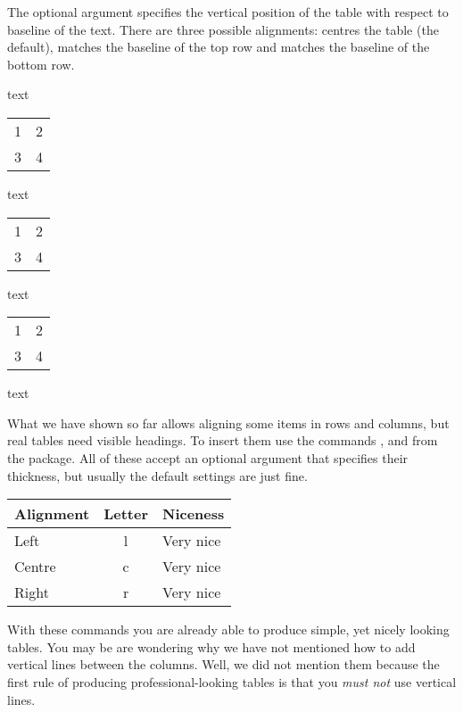 The optional  argument specifies the vertical position of the table
with respect to baseline of the text. There are three possible alignments:
 centres the table (the default),  matches the baseline of
the top row and  matches the baseline of the bottom row.
\begin{example}[examplewidth=0.55\linewidth]
text
\begin{tabular}{ll}
  1 & 2 \\
  3 & 4 \\
\end{tabular}
text
\begin{tabular}[t]{ll}
  1 & 2 \\
  3 & 4 \\
\end{tabular}
text
\begin{tabular}[b]{ll}
  1 & 2 \\
  3 & 4 \\
\end{tabular}
text
\end{example}

What we have shown so far allows aligning some items in rows and columns,
but real tables need visible headings. To insert them use the commands
,  and  from the  package.
All of these accept an optional argument that specifies their thickness, but
usually the default settings are just fine.
\begin{example}[examplewidth=0.43\linewidth]
\begin{tabular}{lcl}
  \toprule
  Alignment & Letter & Niceness  \\
  \midrule
  Left      & l      & Very nice \\
  Centre    & c      & Very nice \\
  Right     & r      & Very nice \\
  \bottomrule
\end{tabular}
\end{example}

With these commands you are already able to produce simple, yet nicely looking
tables. You may be are wondering why we have not mentioned how to add vertical
lines between the columns. Well, we did not mention them because the first rule
of producing professional-looking tables is that you \emph{must not} use
vertical lines.

